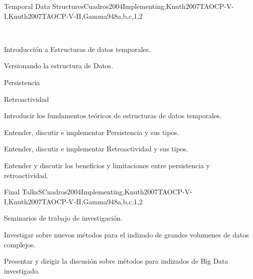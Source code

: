 \begin{syllabus}
\begin{unit}{Temporal Data Structures}{}{Cuadros2004Implementing,Knuth2007TAOCP-V-I,Knuth2007TAOCP-V-II,Gamma94}{8}{a,b,c,1,2}
   \begin{topics}\
         \item Introducción a Estructuras de datos temporales.
         \item Versionando la estructura de Datos.
         \item Persistencia
         \item Retroactividad
   \end{topics}
   \begin{learningoutcomes}
         \item Introducir los fundamentos teóricos de estructuras de datos temporales.
         \item Entender, discutir e implementar Persistencia y sus tipos.
         \item Entender, discutir e implementar Retroactividad y sus tipos.
         \item Entender y discutir los beneficios y  limitaciones entre persistencia y retroactividad.
   \end{learningoutcomes}
\end{unit}

\begin{unit}{Final Talks}{}{SCuadros2004Implementing,Knuth2007TAOCP-V-I,Knuth2007TAOCP-V-II,Gamma94}{8}{a,b,c,1,2}
	\begin{topics}
         \item Seminarios de trabajo de investigación.
   \end{topics}
   \begin{learningoutcomes}
         \item Investigar sobre nuevos métodos para el indizado de grandes volumenes de datos complejos.
         \item Presentar y dirigir la discusión sobre métodos para indizados de Big Data investigado.
   \end{learningoutcomes}
\end{unit}





\begin{coursebibliography}
\end{coursebibliography}

\end{syllabus}
